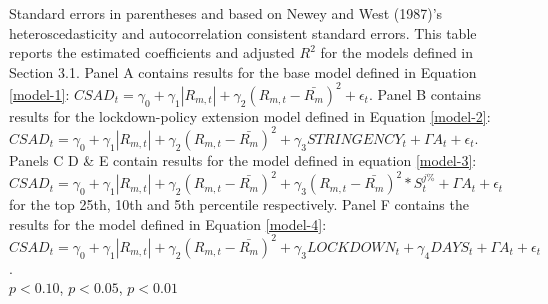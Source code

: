 \begin{table}[htbp]
\begin{threeparttable}
\begin{tabular}{l*{6}{c}}
\bottomrule
\end{tabular}
\begin{tablenotes}
\item \footnotesize Standard errors in parentheses and based on Newey and West (1987)'s heteroscedasticity and autocorrelation consistent standard errors. This table reports the estimated coefficients and adjusted $R^2$ for the models defined in Section 3.1. Panel A contains results for the base model defined in Equation \ref{model-1}: $CSAD_t=\gamma_0+\gamma_1 |R_{m,t}|+\gamma_2 (R_{m,t}-\bar{R_m})^2+\epsilon_t$. Panel B contains results for the lockdown-policy extension model defined in Equation \ref{model-2}: $CSAD_t=\gamma_0+\gamma_1 |R_{m,t}|+\gamma_2(R_{m,t}-\bar{R_m})^2+\gamma_3STRINGENCY_t+\Gamma{A}_t+\epsilon_t$. Panels C D \& E contain results for the model defined in equation \ref{model-3}: $CSAD_t=\gamma_0+\gamma_1 |R_{m,t}|+\gamma_2 (R_{m,t}-\bar{R_m})^2+\gamma_3(R_{m,t}-\bar{R_m})^2*S_t^{j\%}+\Gamma{A}_t+\epsilon_t$ for the top 25th, 10th and 5th percentile respectively. Panel F contains the results for the model defined in Equation \ref{model-4}: $CSAD_t=\gamma_0+\gamma_1 |R_{m,t}|+\gamma_2 (R_{m,t}-\bar{R_m})^2+\gamma_3LOCKDOWN_t+\gamma_4DAYS_t+\Gamma{A}_t+\epsilon_t$.\\
\sym{*} \(p<0.10\), \sym{**} \(p<0.05\), \sym{***} \(p<0.01\)\\
\end{tablenotes}
\end{threeparttable}
\end{table}
